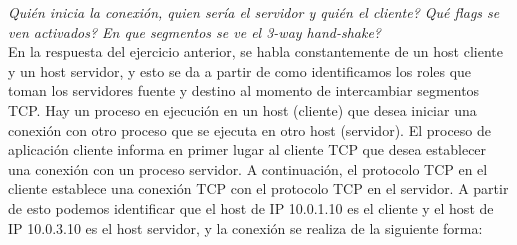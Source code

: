 \documentclass[osajnl,twocolumn,showpacs,superscriptaddress,10pt]{revtex4-1} %
\begin{document}
\textit{Quién inicia la conexión, quien sería el servidor y quién el cliente? Qué flags se ven activados? En que segmentos se ve el 3-way hand-shake?} \\

En la respuesta del ejercicio anterior, se habla constantemente de un host cliente y un host servidor, y esto se da a partir de como identificamos los roles que toman
los servidores fuente y destino al momento de intercambiar segmentos TCP. Hay un proceso en ejecución en un host (cliente) que desea iniciar una conexión con otro proceso 
que se ejecuta en otro host (servidor). El proceso de aplicación cliente informa en primer lugar al cliente TCP que desea establecer una conexión con un proceso servidor. 
A continuación, el protocolo TCP en el cliente establece una conexión TCP con el protocolo TCP en el servidor. A partir de esto podemos identificar que el host de
IP 10.0.1.10 es el cliente y el host de IP 10.0.3.10 es el host servidor, y la conexión se realiza de la siguiente forma:
\end{document}
